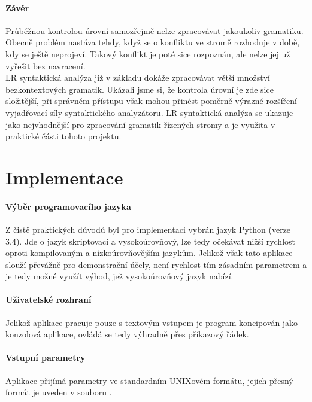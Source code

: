 \subsubsection*{Závěr}

Průběžnou kontrolou úrovní samozřejmě nelze zpracovávat jakoukoliv gramatiku.
Obecně problém nastáva tehdy, když se o konfliktu ve stromě rozhoduje
v době, kdy se ještě neprojeví. Takový konflikt je poté sice rozpoznán,
ale nelze jej už vyřešit bez navracení.\\

LR syntaktická analýza již v základu dokáže zpracovávat větší množství
bezkontextových gramatik. Ukázali jsme si, že kontrola úrovní je zde
sice složitější, při správném přístupu však mohou přinést poměrně výrazné
rozšíření vyjadřovací síly syntaktického analyzátoru.
LR syntaktická analýza se ukazuje jako nejvhodnější pro zpracování
gramatik řízených stromy a je využita v praktické části tohoto projektu.

\chapter{Implementace}
\label{chap:Implementation}

\subsubsection*{Výběr programovacího jazyka}

Z čistě praktických důvodů byl pro implementaci vybrán jazyk Python
(verze 3.4). Jde o jazyk skriptovací a vysokoúrovňový, lze tedy
očekávat nižší rychlost oproti kompilovaným a nízkoúrovňovějším jazykům.
Jelikož však tato aplikace slouží převážně pro demonstrační účely,
není rychlost tím zásadním parametrem a je tedy možné využít
výhod, jež vysokoúrovňový jazyk nabízí.

\subsubsection*{Uživatelské rozhraní}

Jelikož aplikace pracuje pouze s textovým vstupem je program koncipován
jako konzolová aplikace, ovládá se tedy výhradně přes příkazový řádek.

\subsubsection*{Vstupní parametry}

Aplikace přijímá parametry ve standardním UNIXovém formátu, jejich přesný
formát je uveden v souboru .\\

